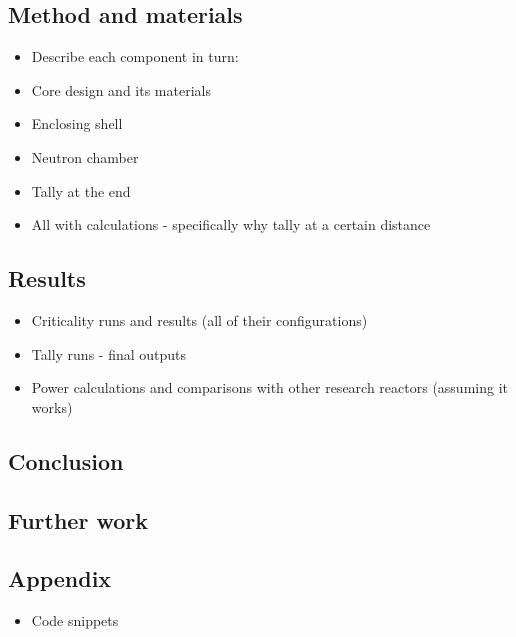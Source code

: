\documentclass[12pt,a4paper]{article}
\begin{document}
\subsection{Method and materials}
\begin{itemize}
	\item Describe each component in turn:
	\item Core design and its materials
	\item Enclosing shell
	\item Neutron chamber
	\item Tally at the end
	\item All with calculations - specifically why tally at a certain distance
\end{itemize}
\subsection{Results}
\begin{itemize}
	\item Criticality runs and results (all of their configurations)
	\item Tally runs - final outputs
	\item Power calculations and comparisons with other research reactors (assuming it works)
\end{itemize}
\subsection{Conclusion}
\subsection{Further work}
\subsection{Appendix}
\begin{itemize}
	\item Code snippets
\end{itemize}
\end{document}
